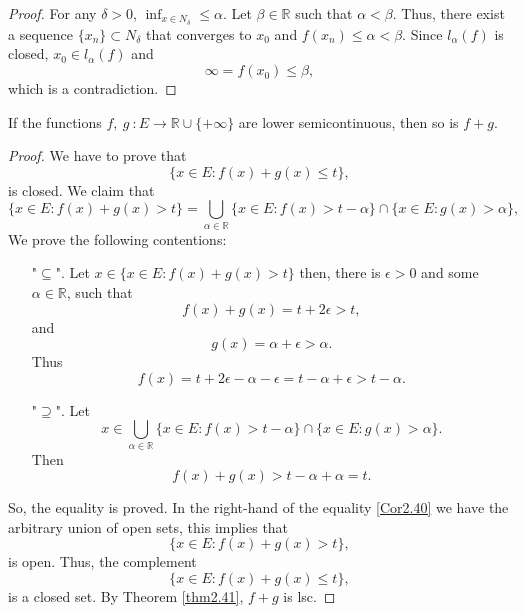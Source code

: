 \begin{proof}
        For any $\delta >0$, $\inf_{x \in N_{\delta}} \leq \alpha$. Let 
        $\beta \in \mathbb{R}$ such that $\alpha < \beta$. Thus, there exist a 
        sequence
        $\{x_n\} \subset N_{\delta}$ that converges to $x_0$ and $f(x_n) \leq 
        \alpha < \beta$. Since $l_{\alpha}(f)$ is closed, $x_0 \in 
        l_{\alpha}(f)$ and
        $$
            \infty = f(x_0) \leq \beta, 
        $$
        which is a contradiction. 
    \end{proof}
    
    \begin{corollary}
        If the functions $f, \ g \ : E \to \mathbb{R} \cup \{+ \infty\}$ are 
        lower semicontinuous, then so is $f + g$.
    \end{corollary}
    \begin{proof}
        We have to prove that
        $$
            \{x \in E : f(x) + g(x) \leq t \},
        $$
        is closed. We claim that
        \begin{equation}\label{Cor2.40}
            \{x \in E : f(x) + g(x) > t \} = \bigcup_{\alpha \in \mathbb{R}} %
                \{x \in E : f(x) > t - \alpha \} \cap \{x \in E : g(x) >  
                \alpha\},
        \end{equation}
        We prove the following contentions:
        \begin{itemize}
            \item["$\subseteq$".]
                Let $x \in \{x \in E : f(x) + g(x) > t \} $ then, there is
                $\epsilon > 0$ and some $\alpha \in \mathbb{R}$, such that
                $$
                    f(x) + g(x) = t + 2\epsilon > t,
                $$
                and 
                $$
                    g(x) = \alpha + \epsilon > \alpha.
                $$
                Thus 
                $$
                    f(x) = t + 2\epsilon - \alpha - \epsilon = t - \alpha %
                    + \epsilon > t - \alpha.
                $$
            \item["$\supseteq$".] Let
            $$
                x \in \bigcup_{\alpha \in \mathbb{R}} %
                \{x \in E : f(x) > t - \alpha \} \cap \{x \in E : g(x) >  
                \alpha\}.
            $$
            Then 
            $$
                f(x) + g(x) > t -\alpha + \alpha = t.
            $$
        \end{itemize}
        So, the equality is proved. In the right-hand of the equality 
        \eqref{Cor2.40} we have the
        arbitrary union of open sets, this implies that
        $$
            \{x \in E : f(x) + g(x) > t \},
        $$
        is open. Thus, the complement
         $$
            \{x \in E : f(x) + g(x) \leq t \},
        $$
        is a closed set. By Theorem \eqref{thm2.41}, $f + g $ is lsc.
    \end{proof}
    
